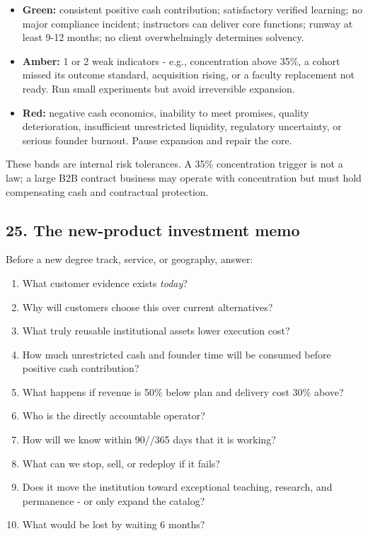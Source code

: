 \begin{itemize}[leftmargin=*,itemsep=1.5pt]
  \item \textbf{Green:} consistent positive cash contribution; satisfactory verified learning; no major compliance incident; instructors can deliver core functions; runway at least 9-12 months; no client overwhelmingly determines solvency.
  \item \textbf{Amber:} 1 or 2 weak indicators - e.g., concentration above 35\%, a cohort missed its outcome standard, acquisition rising, or a faculty replacement not ready. Run small experiments but avoid irreversible expansion.
  \item \textbf{Red:} negative cash economics, inability to meet promises, quality deterioration, insufficient unrestricted liquidity, regulatory uncertainty, or serious founder burnout. Pause expansion and repair the core.
\end{itemize}

These bands are internal risk tolerances. A 35\% concentration trigger is not a law; a large B2B contract business may operate with concentration but must hold compensating cash and contractual protection.

\subsection{25. The new-product investment memo}

Before a new degree track, service, or geography, answer:

\begin{enumerate}[leftmargin=*,itemsep=1.5pt]
  \item What customer evidence exists \textit{today}?
  \item Why will customers choose this over current alternatives?
  \item What truly reusable institutional assets lower execution cost?
  \item How much unrestricted cash and founder time will be consumed before positive cash contribution?
  \item What happens if revenue is 50\% below plan and delivery cost 30\% above?
  \item Who is the directly accountable operator?
  \item How will we know within 90//365 days that it is working?
  \item What can we stop, sell, or redeploy if it fails?
  \item Does it move the institution toward exceptional teaching, research, and permanence - or only expand the catalog?
  \item What would be lost by waiting 6 months?
\end{enumerate}

